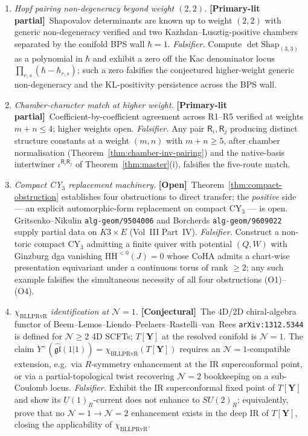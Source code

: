 \documentclass[11pt]{amsart}
\theoremstyle{definition}
\providecommand{\bY}{\mathbf{Y}}
\providecommand{\cN}{\mathcal{N}}
\providecommand{\fgl}{\mathfrak{gl}}
\providecommand{\HH}{\mathrm{HH}}
\providecommand{\ClaimStatusConjectured}{\textbf{\textsf{[Conjectural]}}}
\providecommand{\ClaimStatusOpen}{\textbf{\textsf{[Open]}}}
\providecommand{\ClaimStatusPartialPrimaryLit}{\textbf{\textsf{[Primary-lit partial]}}}
\begin{document}
\begin{enumerate}[label=\emph{$\mathsf F_{\arabic*}$.}, start=5, leftmargin=2.4em]
\item \emph{Hopf pairing non-degeneracy beyond weight $(2,2)$.}
  \ClaimStatusPartialPrimaryLit\
  Shapovalov determinants are known up to weight $(2,2)$ with generic
  non-degeneracy verified and two Kazhdan--Lusztig-positive chambers
  separated by the conifold BPS wall $\hbar = 1$. \emph{Falsifier.} Compute
  $\det\mathrm{Shap}_{(3,3)}$ as a polynomial in $\hbar$ and exhibit
  a zero off the Kac denominator locus
  $\prod_{r,s}(\hbar - \hbar_{r,s})$; such a zero falsifies the
  conjectured higher-weight generic non-degeneracy and the
  KL-positivity persistence across the BPS wall.

\item \emph{Chamber-character match at higher weight.}
  \ClaimStatusPartialPrimaryLit\
  Coefficient-by-coefficient agreement across R1--R5 verified at
  weights $m+n\leq 4$; higher weights open.
  \emph{Falsifier.} Any pair $\mathsf R_{i},\mathsf R_{j}$ producing
  distinct structure constants at a weight $(m,n)$ with
  $m+n\geq 5$, after chamber normalisation
  (Theorem~\ref{thm:chamber-inv-pairing}) and the native-basis
  intertwiner $\iota^{\mathsf R_{i}\mathsf R_{j}}$ of
  Theorem~\ref{thm:master}(i), falsifies the five-route match.

\item \emph{Compact CY$_{3}$ replacement machinery.}
  \ClaimStatusOpen\
  Theorem~\ref{thm:compact-obstruction} establishes four
  obstructions to direct transfer; the \emph{positive} side — an
  explicit automorphic-form replacement on compact CY$_{3}$ — is
  open. Gritsenko--Nikulin \texttt{alg-geom/9504006} and Borcherds
  \texttt{alg-geom/9609022} supply partial data on $K3\times E$
  (Vol~III Part~IV). \emph{Falsifier.} Construct a non-toric compact
  CY$_{3}$ admitting a finite quiver with potential $(Q,W)$ with
  Ginzburg dga vanishing $\HH^{<0}(J)=0$ whose CoHA admits a
  chart-wise presentation equivariant under a continuous torus of
  rank $\geq 2$; any such example falsifies the simultaneous
  necessity of all four obstructions (O1)--(O4).

\item \emph{$\chi_{\mathrm{BLLPRvR}}$ identification at $\cN=1$.}
  \ClaimStatusConjectured\
  The 4D/2D chiral-algebra functor of
  Beem--Lemos--Liendo--Peelaers--Rastelli--van~Rees
  \texttt{arXiv:1312.5344} is defined for $\cN\geq 2$ 4D SCFTs;
  $T[\bY]$ at the resolved conifold is $\cN=1$. The claim
  $Y^{+}(\widehat{\fgl}(1|1)) = \chi_{\mathrm{BLLPRvR}}(T[\bY])$
  requires an $\cN=1$-compatible extension, e.g.\ via $R$-symmetry
  enhancement at the IR superconformal point, or via a
  partial-topological twist recovering $\cN=2$ bookkeeping on a
  sub-Coulomb locus. \emph{Falsifier.} Exhibit the IR superconformal
  fixed point of $T[\bY]$ and show its $U(1)_{R}$-current does not
  enhance to $SU(2)_{R}$; equivalently, prove that no
  $\cN=1\to\cN=2$ enhancement exists in the deep IR of $T[\bY]$,
  closing the applicability of $\chi_{\mathrm{BLLPRvR}}$.
\end{enumerate}
\end{document}

